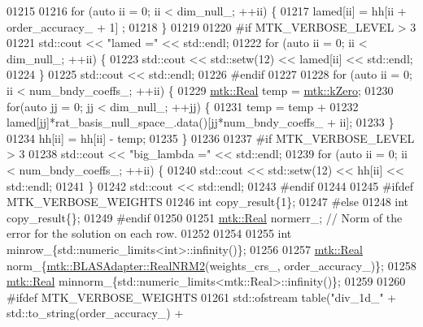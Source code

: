 \begin{DoxyCode}
{{01215 
01216     \textcolor{keywordflow}{for} (\textcolor{keyword}{auto} ii = 0; ii < dim\_null\_; ++ii) \{
01217       lamed[ii] = hh[ii + order\_accuracy\_ + 1] ;
01218     \}
01219 
01220 \textcolor{preprocessor}{    #if MTK\_VERBOSE\_LEVEL > 3}
01221     std::cout << \textcolor{stringliteral}{"lamed ="} << std::endl;
01222     \textcolor{keywordflow}{for} (\textcolor{keyword}{auto} ii = 0; ii < dim\_null\_; ++ii) \{
01223       std::cout << std::setw(12) << lamed[ii] << std::endl;
01224     \}
01225     std::cout << std::endl;
01226 \textcolor{preprocessor}{    #endif}
01227 
01228     \textcolor{keywordflow}{for} (\textcolor{keyword}{auto} ii = 0; ii < num\_bndy\_coeffs\_; ++ii) \{
01229       \hyperlink{group__c01-roots_gac080bbbf5cbb5502c9f00405f894857d}{mtk::Real} temp = \hyperlink{group__c01-roots_ga59a451a5fae30d59649bcda274fea271}{mtk::kZero};
01230       \textcolor{keywordflow}{for}(\textcolor{keyword}{auto} jj = 0; jj < dim\_null\_; ++jj) \{
01231         temp = temp +
01232           lamed[jj]*rat\_basis\_null\_space\_.data()[jj*num\_bndy\_coeffs\_ + ii];
01233       \}
01234       hh[ii] = hh[ii] - temp;
01235     \}
01236 
01237 \textcolor{preprocessor}{    #if MTK\_VERBOSE\_LEVEL > 3}
01238     std::cout << \textcolor{stringliteral}{"big\_lambda ="} << std::endl;
01239     \textcolor{keywordflow}{for} (\textcolor{keyword}{auto} ii = 0; ii < num\_bndy\_coeffs\_; ++ii) \{
01240       std::cout << std::setw(12) << hh[ii] << std::endl;
01241     \}
01242     std::cout << std::endl;
01243 \textcolor{preprocessor}{    #endif}
01244 
01245 \textcolor{preprocessor}{    #ifdef MTK\_VERBOSE\_WEIGHTS}
01246     \textcolor{keywordtype}{int} copy\_result\{1\};
01247 \textcolor{preprocessor}{    #else}
01248     \textcolor{keywordtype}{int} copy\_result\{\};
01249 \textcolor{preprocessor}{    #endif}
01250 
01251     \hyperlink{group__c01-roots_gac080bbbf5cbb5502c9f00405f894857d}{mtk::Real} normerr\_; \textcolor{comment}{// Norm of the error for the solution on each row.}
01252 
01254 
01255     \textcolor{keywordtype}{int} minrow\_\{std::numeric\_limits<int>::infinity()\};
01256 
01257     \hyperlink{group__c01-roots_gac080bbbf5cbb5502c9f00405f894857d}{mtk::Real} norm\_\{\hyperlink{classmtk_1_1BLASAdapter_ab92440888b730863244c5d9479c11aca}{mtk::BLASAdapter::RealNRM2}(weights\_crs\_,
      order\_accuracy\_)\};
01258     \hyperlink{group__c01-roots_gac080bbbf5cbb5502c9f00405f894857d}{mtk::Real} minnorm\_\{std::numeric\_limits<mtk::Real>::infinity()\};
01259 
01260 \textcolor{preprocessor}{    #ifdef MTK\_VERBOSE\_WEIGHTS}
01261     std::ofstream table(\textcolor{stringliteral}{"div\_1d\_"} + std::to\_string(order\_accuracy\_) +
}}
\end{DoxyCode}
